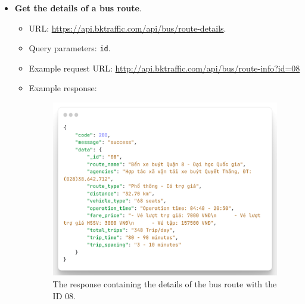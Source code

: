 \begin{itemize}
    \item \textbf{Get the details of a bus route}.
    \begin{itemize}
        \item URL: \url{https://api.bktraffic.com/api/bus/route-details}.
        \item Query parameters: \lstinline{id}.
        \item Example request URL: \url{http://api.bktraffic.com/api/bus/route-info?id=08}
        \item Example response:
        \begin{figure}[H]
            \includegraphics[width=\textwidth]{assets/images/Implementation/route_details_response.png}
            \caption{The response containing the details of the bus route with the ID 08.}
            \label{fig:route_details_response}
        \end{figure}
    \end{itemize}


\end{itemize}

